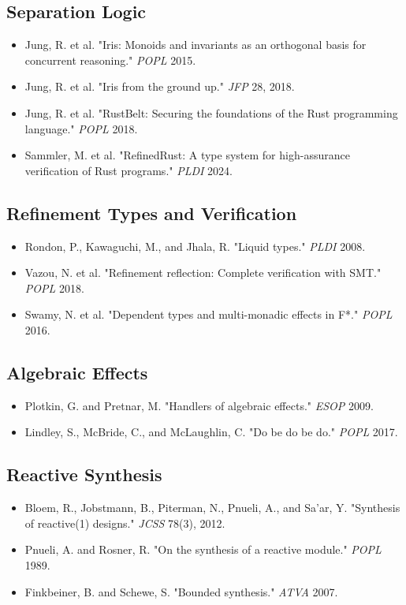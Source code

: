 \documentclass[11pt]{article}
\begin{document}
\subsection{Separation Logic}
\label{sec:org978203d}
\begin{itemize}
\item Jung, R. et al. "Iris: Monoids and invariants as an orthogonal basis for concurrent reasoning." \emph{POPL} 2015.
\item Jung, R. et al. "Iris from the ground up." \emph{JFP} 28, 2018.
\item Jung, R. et al. "RustBelt: Securing the foundations of the Rust programming language." \emph{POPL} 2018.
\item Sammler, M. et al. "RefinedRust: A type system for high-assurance verification of Rust programs." \emph{PLDI} 2024.
\end{itemize}
\subsection{Refinement Types and Verification}
\label{sec:orgf037ec9}
\begin{itemize}
\item Rondon, P., Kawaguchi, M., and Jhala, R. "Liquid types." \emph{PLDI} 2008.
\item Vazou, N. et al. "Refinement reflection: Complete verification with SMT." \emph{POPL} 2018.
\item Swamy, N. et al. "Dependent types and multi-monadic effects in F*." \emph{POPL} 2016.
\end{itemize}
\subsection{Algebraic Effects}
\label{sec:org708df32}
\begin{itemize}
\item Plotkin, G. and Pretnar, M. "Handlers of algebraic effects." \emph{ESOP} 2009.
\item Lindley, S., McBride, C., and McLaughlin, C. "Do be do be do." \emph{POPL} 2017.
\end{itemize}
\subsection{Reactive Synthesis}
\label{sec:orgeab16d5}
\begin{itemize}
\item Bloem, R., Jobstmann, B., Piterman, N., Pnueli, A., and Sa'ar, Y. "Synthesis of reactive(1) designs." \emph{JCSS} 78(3), 2012.
\item Pnueli, A. and Rosner, R. "On the synthesis of a reactive module." \emph{POPL} 1989.
\item Finkbeiner, B. and Schewe, S. "Bounded synthesis." \emph{ATVA} 2007.
\end{itemize}
\end{document}
